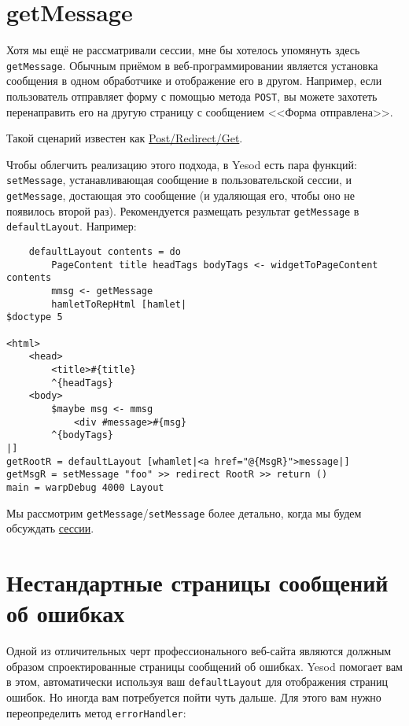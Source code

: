 \section {getMessage}

Хотя мы ещё не рассматривали сессии, мне бы хотелось упомянуть здесь \lstinline!getMessage!. Обычным приёмом в веб-программировании является установка сообщения в одном обработчике и отображение его в другом. Например, если пользователь отправляет форму с помощью метода \lstinline!POST!, вы можете захотеть перенаправить его на другую страницу с сообщением <<Форма отправлена>>.

\begin{remark}
Такой сценарий известен как \href{http://en.wikipedia.org/wiki/Post/Redirect/Get}{Post/Redirect/Get}\footnotemark[\value{footnote}].
\end{remark}


Чтобы облегчить реализацию этого подхода, в Yesod есть пара функций: \lstinline!setMessage!, устанавливающая сообщение в пользовательской сессии, и \lstinline!getMessage!, достающая это сообщение (и удаляющая его, чтобы оно не появилось второй раз). Рекомендуется размещать результат \lstinline!getMessage! в \lstinline!defaultLayout!. Например:

\begin{lstlisting}
    defaultLayout contents = do
        PageContent title headTags bodyTags <- widgetToPageContent contents
        mmsg <- getMessage
        hamletToRepHtml [hamlet|
$doctype 5

<html>
    <head>
        <title>#{title}
        ^{headTags}
    <body>
        $maybe msg <- mmsg
            <div #message>#{msg}
        ^{bodyTags}
|]
getRootR = defaultLayout [whamlet|<a href="@{MsgR}">message|]
getMsgR = setMessage "foo" >> redirect RootR >> return ()
main = warpDebug 4000 Layout
\end{lstlisting}%

Мы рассмотрим \lstinline!getMessage!/\lstinline!setMessage! более детально, когда мы будем обсуждать \hyperref[ch:sessions]{сессии}.

\section {Нестандартные страницы сообщений об ошибках}

Одной из отличительных черт профессионального веб-сайта являются должным образом спроектированные страницы сообщений об ошибках. Yesod помогает вам в этом, автоматически используя ваш \lstinline!defaultLayout! для отображения страниц ошибок. Но иногда вам потребуется пойти чуть дальше. Для этого вам нужно переопределить метод \lstinline!errorHandler!:


